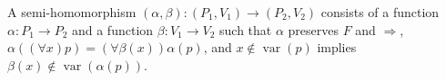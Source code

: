 A semi-homomorphism $(\alpha, \beta): (P_1, V_1) \to (P_2, V_2)$ consists of a function $\alpha: P_1 \to P_2$ and a function $\beta: V_1 \to V_2$ such that $\alpha$ preserves $F$ and $\Rightarrow$, $\alpha((\forall x)p) = (\forall \beta(x))\alpha(p)$, and $x \notin \operatorname{var}(p)$ implies $\beta(x) \notin \operatorname{var}(\alpha(p))$.
